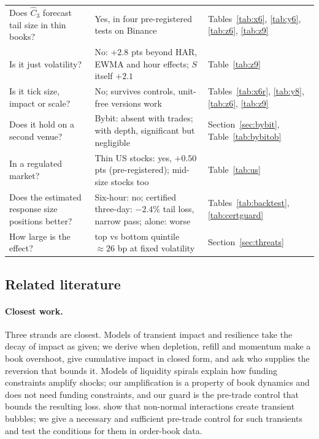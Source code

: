 \documentclass[12pt]{article}
\theoremstyle{definition}
\theoremstyle{remark}
\begin{document}
\begin{table}[t]
\begin{threeparttable}
\begin{tabular}{p{}p{}p{}}
Does $\hat C_3$ forecast tail size in thin books? & Yes, in four pre-registered tests on Binance & Tables~\ref{tab:x6}, \ref{tab:y6}, \ref{tab:z6}, \ref{tab:z9}\\
Is it just volatility? & No: $+2.8$ pts beyond HAR, EWMA and hour effects; $S$ itself $+2.1$ & Table~\ref{tab:z9}\\
Is it tick size, impact or scale? & No; survives controls, unit-free versions work & Tables~\ref{tab:x6r}, \ref{tab:y8}, \ref{tab:z6}, \ref{tab:z9}\\
Does it hold on a second venue? & Bybit: absent with trades; with depth, significant but negligible & Section~\ref{sec:bybit}, Table~\ref{tab:bybitob}\\
In a regulated market? & Thin US stocks: yes, $+0.50$ pts (pre-registered); mid-size stocks too & Table~\ref{tab:us}\\
Does the estimated response size positions better? & Six-hour: no; certified three-day: $-2.4\%$ tail loss, narrow pass; alone: worse & Tables~\ref{tab:backtest}, \ref{tab:certguard}\\
How large is the effect? & top vs bottom quintile $\approx26$ bp at fixed volatility & Section~\ref{sec:threats}\\
\bottomrule
\end{tabular}
\end{threeparttable}
\end{table}

\subsection{Related literature}

\paragraph{Closest work.} Three strands are closest. Models of transient impact and resilience \citep{obizhaeva2013,bouchaud2004,bouchaud2018} take the decay of impact as given; we derive when depletion, refill and momentum make a book overshoot, give cumulative impact in closed form, and ask who supplies the reversion that bounds it. Models of liquidity spirals \citep{brunnermeier2009,shleifer1992} explain how funding constraints amplify shocks; our amplification is a property of book dynamics and does not need funding constraints, and our guard is the pre-trade control that bounds the resulting loss. \citet{sornette2023} show that non-normal interactions create transient bubbles; we give a necessary and sufficient pre-trade control for such transients and test the conditions for them in order-book data.
\end{document}
